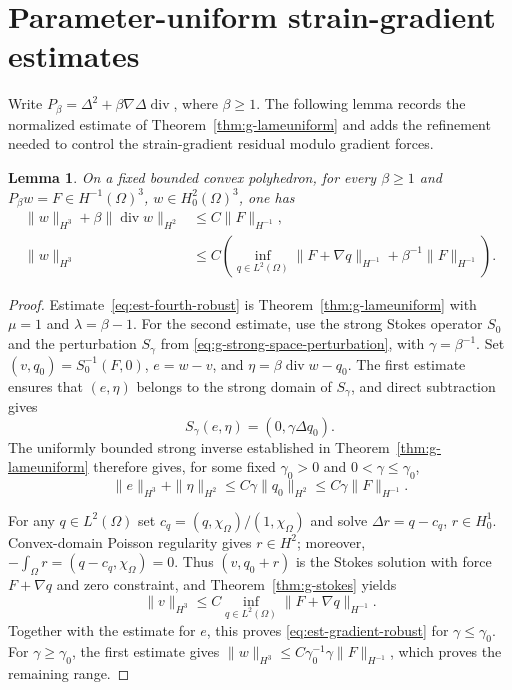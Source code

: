 \documentclass[11pt,a4paper]{article}
\newtheorem{lemma}[theorem]{Lemma}
\theoremstyle{remark}
\numberwithin{equation}{section}
\begin{document}
\section{Parameter-uniform strain-gradient estimates}
\label{sec:est-sge}

Write $P_\beta=\Delta^2+\beta\nabla\Delta\operatorname{div}$, where
$\beta\ge1$. The following lemma records the normalized estimate of
Theorem~\ref{thm:g-lameuniform} and adds the refinement needed to control
the strain-gradient residual modulo gradient forces.

\begin{lemma}\label{lem:est-fourth-consequences}
On a fixed bounded convex polyhedron, for every $\beta\ge1$ and
$P_\beta w=F\in H^{-1}(\Omega)^3$, $w\in H_0^2(\Omega)^3$, one has
\begin{align}
 \|w\|_{H^3}+\beta\|\operatorname{div}w\|_{H^2}
 &\le C\|F\|_{H^{-1}},\label{eq:est-fourth-robust}\\
 \|w\|_{H^3}
 &\le C\left(\inf_{q\in L^2(\Omega)}\|F+\nabla q\|_{H^{-1}}
                     +\beta^{-1}\|F\|_{H^{-1}}\right).
 \label{eq:est-gradient-robust}
\end{align}
\end{lemma}

\begin{proof}
Estimate~\eqref{eq:est-fourth-robust} is
Theorem~\ref{thm:g-lameuniform} with $\mu=1$ and $\lambda=\beta-1$.
For the second estimate, use the strong Stokes operator $S_0$ and the
perturbation $S_\gamma$ from \eqref{eq:g-strong-space-perturbation},
with $\gamma=\beta^{-1}$. Set $(v,q_0)=S_0^{-1}(F,0)$,
$e=w-v$, and $\eta=\beta\operatorname{div}w-q_0$.
The first estimate ensures that $(e,\eta)$ belongs to the strong
domain of $S_\gamma$, and direct subtraction gives
\[
 S_\gamma(e,\eta)=(0,\gamma\Delta q_0).
\]
The uniformly bounded strong inverse established in
Theorem~\ref{thm:g-lameuniform} therefore gives, for some fixed
$\gamma_0>0$ and $0<\gamma\le\gamma_0$,
\[
 \|e\|_{H^3}+\|\eta\|_{H^2}
 \le C\gamma\|q_0\|_{H^2}
 \le C\gamma\|F\|_{H^{-1}}.
\]

For any $q\in L^2(\Omega)$ set
$c_q=(q,\chi_\Omega)/(1,\chi_\Omega)$ and solve
$\Delta r=q-c_q$, $r\in H^1_0$.
Convex-domain Poisson regularity gives $r\in H^2$; moreover,
$-\int_\Omega r=(q-c_q,\chi_\Omega)=0$.
Thus $(v,q_0+r)$ is the Stokes solution with force $F+\nabla q$
and zero constraint, and Theorem~\ref{thm:g-stokes} yields
\[
 \|v\|_{H^3}
 \le C\inf_{q\in L^2(\Omega)}\|F+\nabla q\|_{H^{-1}}.
\]
Together with the estimate for $e$, this proves
\eqref{eq:est-gradient-robust} for $\gamma\le\gamma_0$.
For $\gamma\ge\gamma_0$, the first estimate gives
$\|w\|_{H^3}\le C\gamma_0^{-1}\gamma\|F\|_{H^{-1}}$,
which proves the remaining range.
\end{proof}
\end{document}
